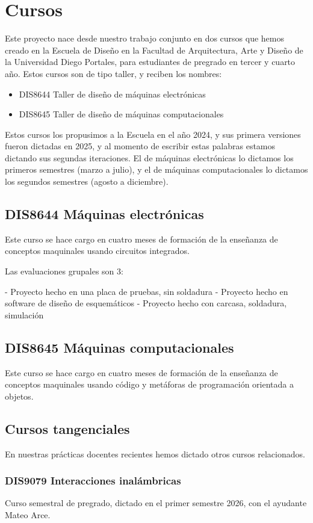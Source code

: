 \documentclass[../principal.tex]{subfiles}
\begin{document}

\chapter{Cursos}

Este proyecto nace desde nuestro trabajo conjunto en dos cursos que hemos creado en la Escuela de Diseño en la Facultad de Arquitectura, Arte y Diseño de la Universidad Diego Portales, para estudiantes de pregrado en tercer y cuarto año. Estos cursos son de tipo taller, y reciben los nombres:

\begin{itemize}
    \item DIS8644 Taller de diseño de máquinas electrónicas
    \item DIS8645 Taller de diseño de máquinas computacionales
\end{itemize}


Estos cursos los propusimos a la Escuela en el año 2024, y sus primera versiones fueron dictadas en 2025, y al momento de escribir estas palabras estamos dictando sus segundas iteraciones. El de máquinas electrónicas lo dictamos los primeros semestres (marzo a julio), y el de máquinas computacionales lo dictamos los segundos semestres (agosto a diciembre).


\section{DIS8644 Máquinas electrónicas}

Este curso se hace cargo en cuatro meses de formación de la enseñanza de conceptos maquinales usando circuitos integrados.

Las evaluaciones grupales son 3:

- Proyecto hecho en una placa de pruebas, sin soldadura
- Proyecto hecho en software de diseño de esquemáticos
- Proyecto hecho con carcasa, soldadura, simulación


\section{DIS8645 Máquinas computacionales}

Este curso se hace cargo en cuatro meses de formación de la enseñanza de conceptos maquinales usando código y metáforas de programación orientada a objetos.

\section{Cursos tangenciales}

En nuestras prácticas docentes recientes hemos dictado otros cursos relacionados.

\subsection{DIS9079 Interacciones inalámbricas}

Curso semestral de pregrado, dictado en el primer semestre 2026, con el ayudante Mateo Arce.



\newpage
\end{document}
